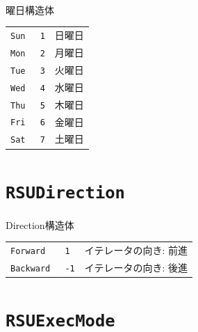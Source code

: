 \paragraph{\DocStrDescription}曜日構造体
\begin{center}
{\footnotesize
\begin{xltabular}{\textwidth}{|p{5truecm}|p{2truecm}|X|}
\hline
\thead{\DocStrHeaderStructMemberName}&\thead{\DocStrHeaderStructMemberValue}&\thead{\DocStrDescription}\\
\hline
\hline
\texttt{Sun}&\texttt{	1}&日曜日\\
\hline
\texttt{Mon}&\texttt{	2}&月曜日\\
\hline
\texttt{Tue}&\texttt{	3}&火曜日\\
\hline
\texttt{Wed}&\texttt{	4}&水曜日\\
\hline
\texttt{Thu}&\texttt{	5}&木曜日\\
\hline
\texttt{Fri}&\texttt{	6}&金曜日\\
\hline
\texttt{Sat}&\texttt{	7}&土曜日\\
\hline
\end{xltabular}
}
\end{center}
\section{\texttt{RSUDirection}}
\paragraph{\DocStrDescription}Direction構造体
\begin{center}
{\footnotesize
\begin{xltabular}{\textwidth}{|p{5truecm}|p{2truecm}|X|}
\hline
\thead{\DocStrHeaderStructMemberName}&\thead{\DocStrHeaderStructMemberValue}&\thead{\DocStrDescription}\\
\hline
\hline
\texttt{Forward}&\texttt{	1}&イテレータの向き: 前進\\
\hline
\texttt{Backward}&\texttt{	-1}&イテレータの向き: 後進\\
\hline
\end{xltabular}
}
\end{center}
\section{\texttt{RSUExecMode}}
